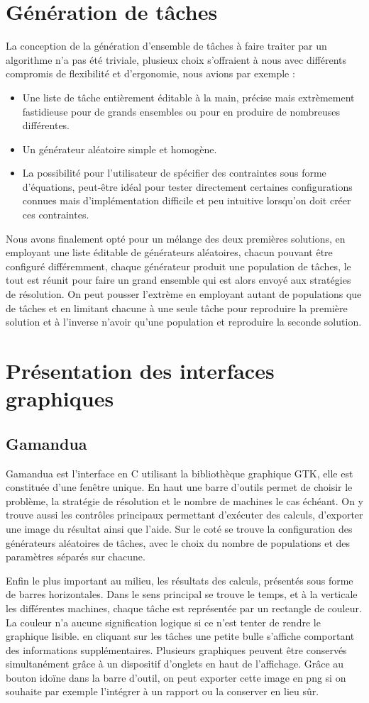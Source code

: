 \section{Génération de tâches}
La conception de la génération d'ensemble de tâches à faire traiter par un
algorithme n'a pas été triviale, plusieux choix s'offraient à nous avec différents
compromis de flexibilité et d'ergonomie, nous avions par exemple :
\begin{itemize}
   \item Une liste de tâche entièrement éditable à la main, précise mais extrèmement
   fastidieuse pour de grands ensembles ou pour en produire de nombreuses différentes.
   \item Un générateur aléatoire simple et homogène.
   \item La possibilité pour l'utilisateur de spécifier des contraintes sous forme
   d'équations, peut-être idéal pour tester directement certaines configurations
   connues mais d'implémentation difficile et peu intuitive lorsqu'on doit créer
   ces contraintes.
\end{itemize}
Nous avons finalement opté pour un mélange des deux premières solutions, en
employant une liste éditable de générateurs aléatoires, chacun pouvant être
configuré différemment, chaque générateur produit une population de tâches,
le tout est réunit pour faire un grand ensemble qui est alors envoyé aux
stratégies de résolution. On peut pousser l'extrème en employant autant de
populations que de tâches et en limitant chacune à une seule tâche pour reproduire
la première solution et à l'inverse n'avoir qu'une population et reproduire la seconde
solution.
\section{Présentation des interfaces graphiques}
\subsection{Gamandua}
Gamandua est l'interface en C utilisant la bibliothèque graphique GTK, elle est
constituée d'une fenêtre unique. En haut une barre d'outils permet de choisir 
le problème, la stratégie de résolution et le nombre de machines le cas échéant.
On y trouve aussi les contrôles principaux permettant d'exécuter des calculs,
d'exporter une image du résultat ainsi que l'aide. Sur le coté se trouve la
configuration des générateurs aléatoires de tâches, avec le choix du nombre
de populations et des paramètres séparés sur chacune.

Enfin le plus important au
milieu, les résultats des calculs, présentés sous forme de barres horizontales.
Dans le sens principal se trouve le temps, et à la verticale les différentes
machines, chaque tâche est représentée par un rectangle de couleur. La couleur
n'a aucune signification logique si ce n'est tenter de rendre le graphique
lisible. en cliquant sur les tâches une petite bulle s'affiche comportant des
informations supplémentaires. Plusieurs graphiques peuvent être conservés
simultanément grâce à un dispositif d'onglets en haut de l'affichage. Grâce au
bouton idoïne dans la barre d'outil, on peut exporter cette image en png si
on souhaite par exemple l'intégrer à un rapport ou la conserver en lieu sûr.
